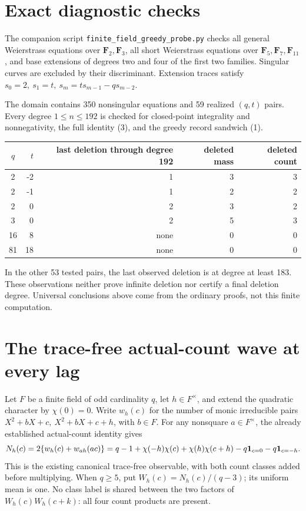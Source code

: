 \documentclass[11pt]{article}
\newcommand{\F}{\mathbf F}
\begin{document}
\section{Exact diagnostic checks}
The companion script \texttt{finite\_field\_greedy\_probe.py} checks all
general Weierstrass equations over \(\F_2,\F_3\), all short Weierstrass
equations over \(\F_5,\F_7,\F_{11}\), and base extensions of degrees
two and four of the first two families. Singular curves are excluded
by their discriminant. Extension traces satisfy
\(s_0=2,\ s_1=t,\ s_m=ts_{m-1}-qs_{m-2}\).

The domain contains 350 nonsingular equations and 59 realized
\((q,t)\) pairs. Every degree \(1\leq n\leq192\) is checked for
closed-point integrality and nonnegativity, the full identity (3),
and the greedy record sandwich (1).
\begin{center}
\begin{tabular}{c|r|r|r|r}
\(q\)&\(t\)&last deletion through degree 192&deleted mass&deleted count\\ \hline
2&-2&1&3&3\\
2&-1&1&2&2\\
2&0&2&3&2\\
3&0&2&5&3\\
16&8&none&0&0\\
81&18&none&0&0
\end{tabular}
\end{center}
In the other 53 tested pairs, the last observed deletion is at degree
at least 183. These observations neither prove infinite deletion nor
certify a final deletion degree. Universal conclusions above come from
the ordinary proofs, not this finite computation.

\section{The trace-free actual-count wave at every lag}
\label{sec:trace-free-wave}
Let \(F\) be a finite field of odd cardinality \(q\), let
\(h\in F^\times\), and extend the quadratic character by \(\chi(0)=0\).
Write \(w_h(c)\) for the number of monic irreducible pairs
\(X^2+bX+c,\ X^2+bX+c+h\), with \(b\in F\).
For any nonsquare \(a\in F^\times\), the already established actual-count
identity gives
\[
 N_h(c)=2\{w_h(c)+w_{ah}(ac)\}
 =q-1+\chi(-h)\chi(c)+\chi(h)\chi(c+h)
       -q{\bf1}_{c=0}-q{\bf1}_{c=-h}.
\]
This is the existing canonical trace-free observable, with both count
classes added before multiplying. When \(q\ge5\), put
\(W_h(c)=N_h(c)/(q-3)\); its uniform mean is one.
No class label is shared between the two factors of
\(W_h(c)W_h(c+k)\): all four count products are present.
\end{document}
